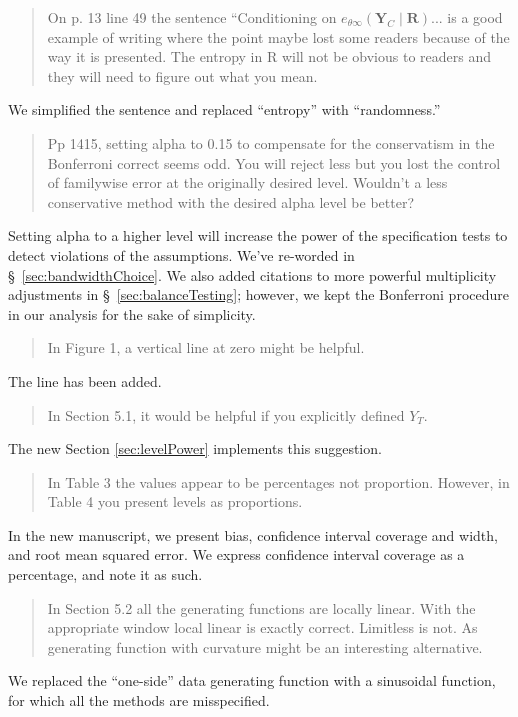 \documentclass[12pt]{article}
\begin{document}
\begin{quote}
On p. 13 line 49 the sentence “Conditioning on $e_{\theta\infty}(\mathbf{Y}_C \mid \mathbf{R})$... is a good example of
writing where the point maybe lost some readers because of the way it
is presented. The entropy in R will not be obvious to readers and they
will need to figure out what you mean.
\end{quote}
We simplified the sentence and replaced ``entropy'' with
``randomness.''

\begin{quote}
Pp 14­15, setting alpha to 0.15 to compensate for the conservatism in
the Bonferroni correct seems odd. You will reject less but you lost
the control of familywise error at the originally desired
level. Wouldn’t a less conservative method with the desired alpha
level be better?
\end{quote}
Setting alpha to a higher level will increase the power of the
specification tests to detect violations of the assumptions. We've
re-worded in \S~\ref{sec:bandwidthChoice}.
We also added citations to more powerful multiplicity adjustments in
\S~\ref{sec:balanceTesting}; however, we kept the Bonferroni procedure
in our analysis for the sake of simplicity.

\begin{quote}
In Figure 1, a vertical line at zero might be helpful.
\end{quote}
The line has been added.

\begin{quote}
In Section 5.1, it would be helpful if you explicitly defined $Y_T$.
\end{quote}
The new Section \ref{sec:levelPower} implements this suggestion.

\begin{quote}
In Table 3 the values appear to be percentages not proportion. However,
in Table 4 you present levels as proportions.
\end{quote}
In the new manuscript, we present bias, confidence interval coverage
and width, and root mean squared error. We express confidence interval
coverage as a percentage, and note it as such.

\begin{quote}
In Section 5.2 all the
generating functions are locally linear. With the appropriate window
local linear is exactly correct. Limitless is not. As generating
function with curvature might be an interesting alternative.
\end{quote}
We replaced the ``one-side'' data generating function with a
sinusoidal function, for which all the methods are misspecified.
\end{document}
